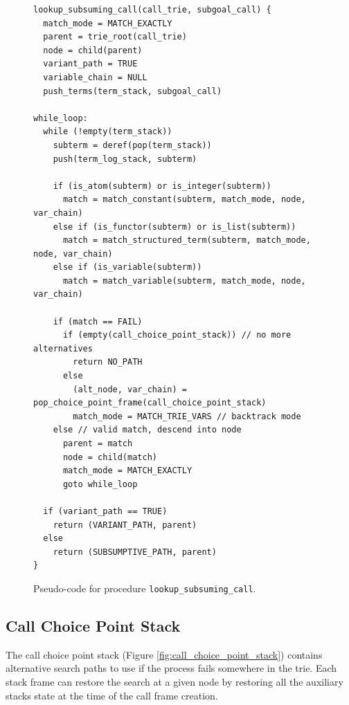 \begin{figure}[ht]
\begin{Verbatim}
lookup_subsuming_call(call_trie, subgoal_call) {
  match_mode = MATCH_EXACTLY
  parent = trie_root(call_trie)
  node = child(parent)
  variant_path = TRUE
  variable_chain = NULL
  push_terms(term_stack, subgoal_call)

while_loop:
  while (!empty(term_stack))
    subterm = deref(pop(term_stack))
    push(term_log_stack, subterm)
  
    if (is_atom(subterm) or is_integer(subterm))
      match = match_constant(subterm, match_mode, node, var_chain)
    else if (is_functor(subterm) or is_list(subterm))
      match = match_structured_term(subterm, match_mode, node, var_chain)
    else if (is_variable(subterm))
      match = match_variable(subterm, match_mode, node, var_chain)
  
    if (match == FAIL)
      if (empty(call_choice_point_stack)) // no more alternatives
        return NO_PATH
      else
        (alt_node, var_chain) = pop_choice_point_frame(call_choice_point_stack)
        match_mode = MATCH_TRIE_VARS // backtrack mode
    else // valid match, descend into node
      parent = match
      node = child(match)
      match_mode = MATCH_EXACTLY
      goto while_loop
  
  if (variant_path == TRUE)
    return (VARIANT_PATH, parent)
  else
    return (SUBSUMPTIVE_PATH, parent)
}
\end{Verbatim}
\caption{Pseudo-code for procedure \texttt{lookup\_subsuming\_call}.}
\label{fig:lookup_subsuming_call}
\end{figure}

\subsection{Call Choice Point Stack}

The call choice point stack (Figure \ref{fig:call_choice_point_stack}) contains alternative
search paths to use if the process fails somewhere in the trie.
Each stack frame can restore the search at a given node by restoring all the auxiliary stacks state at the time
of the call frame creation.

